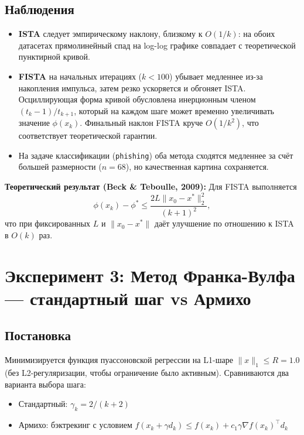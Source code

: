 \documentclass[a4paper,12pt]{article}
\begin{document}
\subsection*{Наблюдения}

\begin{itemize}
    \item \textbf{ISTA} следует эмпирическому наклону, близкому к $O(1/k)$: на обоих датасетах прямолинейный спад на log-log графике совпадает с теоретической пунктирной кривой.

    \item \textbf{FISTA} на начальных итерациях ($k < 100$) убывает медленнее из-за накопления импульса, затем резко ускоряется и обгоняет ISTA. Осциллирующая форма кривой обусловлена инерционным членом $(t_k - 1)/t_{k+1}$, который на каждом шаге может временно увеличивать значение $\phi(x_k)$. Финальный наклон FISTA круче $O(1/k^2)$, что соответствует теоретической гарантии.

    \item На задаче классификации (\texttt{phishing}) оба метода сходятся медленнее за счёт большей размерности ($n = 68$), но качественная картина сохраняется.
\end{itemize}

\textbf{Теоретический результат (Beck \& Teboulle, 2009):}
Для FISTA выполняется
\[
\phi(x_k) - \phi^* \le \frac{2L\|x_0 - x^*\|_2^2}{(k+1)^2},
\]
что при фиксированных $L$ и $\|x_0 - x^*\|$ даёт улучшение по отношению к ISTA в $O(k)$ раз.

\newpage
\section*{Эксперимент 3: Метод Франка-Вулфа — стандартный шаг vs Армихо}

\subsection*{Постановка}

Минимизируется функция пуассоновской регрессии на L1-шаре $\|x\|_1 \le R = 1.0$
(без L2-регуляризации, чтобы ограничение было активным).
Сравниваются два варианта выбора шага:
\begin{itemize}
    \item Стандартный: $\gamma_k = 2/(k+2)$
    \item Армихо: бэктрекинг с условием $f(x_k + \gamma d_k) \le f(x_k) + c_1 \gamma \nabla f(x_k)^\top d_k$
\end{itemize}
\end{document}
